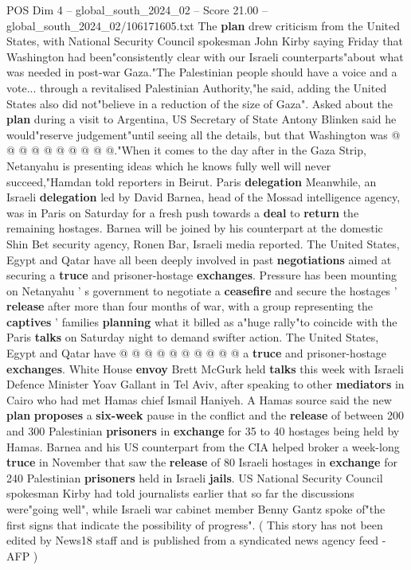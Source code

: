 \begin{textsample}{POS Dim 4 – global\_south\_2024\_02 – Score 21.00 – global\_south\_2024\_02/106171605.txt}
The \textbf{plan} drew criticism from the United States, with National Security Council spokesman John Kirby saying Friday that Washington had been"consistently clear with our Israeli counterparts"about what was needed in post-war Gaza."The Palestinian people should have a voice and a vote... through a revitalised Palestinian Authority,"he said, adding the United States also did not"believe in a reduction of the size of Gaza".
Asked about the \textbf{plan} during a visit to Argentina, US Secretary of State Antony Blinken said he would"reserve judgement"until seeing all the details, but that Washington was @ @ @ @ @ @ @ @ @ @."When it comes to the day after in the Gaza Strip, Netanyahu is presenting ideas which he knows fully well will never succeed,"Hamdan told reporters in Beirut.
Paris \textbf{delegation} Meanwhile, an Israeli \textbf{delegation} led by David Barnea, head of the Mossad intelligence agency, was in Paris on Saturday for a fresh push towards a \textbf{deal} to \textbf{return} the remaining hostages.
Barnea will be joined by his counterpart at the domestic Shin Bet security agency, Ronen Bar, Israeli media reported.
The United States, Egypt and Qatar have all been deeply involved in past \textbf{negotiations} aimed at securing a \textbf{truce} and prisoner-hostage \textbf{exchanges}.
Pressure has been mounting on Netanyahu ' s government to negotiate a \textbf{ceasefire} and secure the hostages ' \textbf{release} after more than four months of war, with a group representing the \textbf{captives} ' families \textbf{planning} what it billed as a"huge rally"to coincide with the Paris \textbf{talks} on Saturday night to demand swifter action.
The United States, Egypt and Qatar have @ @ @ @ @ @ @ @ @ @ a \textbf{truce} and prisoner-hostage \textbf{exchanges}.
White House \textbf{envoy} Brett McGurk held \textbf{talks} this week with Israeli Defence Minister Yoav Gallant in Tel Aviv, after speaking to other \textbf{mediators} in Cairo who had met Hamas chief Ismail Haniyeh.
A Hamas source said the new \textbf{plan} \textbf{proposes} a \textbf{six-week} pause in the conflict and the \textbf{release} of between 200 and 300 Palestinian \textbf{prisoners} in \textbf{exchange} for 35 to 40 hostages being held by Hamas.
Barnea and his US counterpart from the CIA helped broker a week-long \textbf{truce} in November that saw the \textbf{release} of 80 Israeli hostages in \textbf{exchange} for 240 Palestinian \textbf{prisoners} held in Israeli \textbf{jails}.
US National Security Council spokesman Kirby had told journalists earlier that so far the discussions were"going well", while Israeli war cabinet member Benny Gantz spoke of"the first signs that indicate the possibility of progress". ( This story has not been edited by News18 staff and is published from a syndicated news agency feed - AFP )

\end{textsample}
